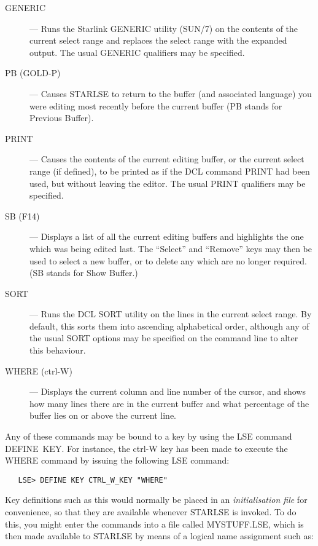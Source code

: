 \begin{description}
\item[GENERIC] --- Runs the Starlink \mbox{GENERIC} utility (SUN/7) on the
contents of the current select range and replaces the select range with the
expanded output.
The usual \mbox{GENERIC} qualifiers may be specified.

\item[PB (GOLD-P)] --- Causes STARLSE to return to the buffer (and associated
language) you were editing most recently before the current buffer (PB stands
for Previous Buffer).

\item[PRINT] --- Causes the contents of the current editing buffer, or the
current select range (if defined), to be printed as if the \mbox{DCL}
command \mbox{PRINT} had been used, but without leaving the editor.
The usual \mbox{PRINT} qualifiers may be specified.

\item[SB (F14)] --- Displays a list of all the current editing buffers and
highlights the one which was being edited last. The ``Select'' and ``Remove''
keys may then be used to select a new buffer, or to delete any which are no
longer required. (SB stands for Show Buffer.)

\item[SORT] --- Runs the \mbox{DCL} \mbox{SORT} utility on the lines in the
current select range.
By default, this sorts them into ascending alphabetical order, although any
of the usual \mbox{SORT} options may be specified on the command line to
alter this behaviour.

\item[WHERE (ctrl-W)] --- Displays the current column and line number of the
cursor, and shows how many lines there are in the current buffer and what
percentage of the buffer lies on or above the current line.

\end{description}

Any of these commands may be bound to a key by using the \mbox{LSE} command
\mbox{DEFINE}~\mbox{KEY}.
For instance, the \mbox{ctrl-W} key has been made to execute the
\mbox{WHERE} command by issuing the following \mbox{LSE} command:

\begin{verbatim}
   LSE> DEFINE KEY CTRL_W_KEY "WHERE"
\end{verbatim}

Key definitions such as this would normally be placed in an {\em
initialisation file} for convenience, so that they are available whenever
\mbox{STARLSE} is invoked.
To do this, you might enter the commands into a file called
\mbox{MYSTUFF.LSE}, which is then made available to \mbox{STARLSE} by means
of a logical name assignment such as:

